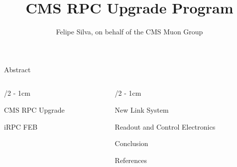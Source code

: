 \documentclass[portrait]{uioposter}
\title{CMS RPC Upgrade Program}
\author
{%
    Felipe Silva, on behalf of the CMS Muon Group 
}
\institute
{
   Rio de Janeiro State University - Email: felipe.silva@cern.ch
}
\begin{document}
\begin{frame}


    \begin{block}{Abstract}
        \vskip-1.5cm
        
    \end{block}

\begin{columns}[onlytextwidth]

\begin{column}{\textwidth/2 - 1cm}

    \vskip-2cm
    \begin{block}{CMS RPC Upgrade}
        \vskip-1.5cm
        
    \end{block}


    \vskip-2cm
    \begin{block}{iRPC FEB}
        \vskip-1.5cm
        
    \end{block}
    
\end{column}


\begin{column}{\textwidth/2 - 1cm}

    \vskip-2cm
    \begin{block}{New Link System}
        \vskip-1.5cm
        
    \end{block}

    \vskip-2cm
    \begin{block}{Readout and Control Electronics}
        \vskip-1.5cm
        
    \end{block}


    \vskip-2cm
    \begin{block}{Conclusion}
        \vskip-1.5cm
        
    \end{block}

    \vskip-2cm
    \begin{block}{References}
        \printbibliography
    \end{block}


\end{column}



\end{columns}
\end{frame}
\end{document}
